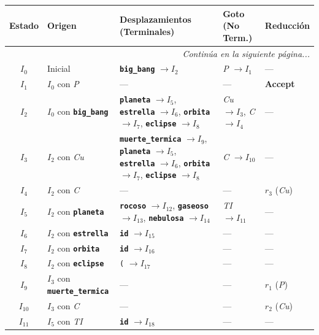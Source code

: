 \documentclass[12pt, letterpaper]{article}
\begin{document}
{\small
\begin{longtable}{c l p{5.0cm} p{2.6cm} p{3.6cm}}
\toprule
\textbf{Estado} & \textbf{Origen} & \textbf{Desplazamientos (Terminales)} & \textbf{Goto (No Term.)} & \textbf{Reducción} \\
\midrule
\endhead
\midrule
\multicolumn{5}{r}{\footnotesize\emph{Continúa en la siguiente página...}} \\
\endfoot
\bottomrule
\endlastfoot

$I_{0}$ & Inicial & \textbf{\texttt{big\_bang}} $\to I_{2}$ & \textit{P} $\to I_{1}$ & --- \\
\addlinespace[2pt]
$I_{1}$ & $I_{0}$ con \textit{P} & --- & --- & \textbf{\color{primary}Accept} \\
\addlinespace[2pt]
$I_{2}$ & $I_{0}$ con \textbf{\texttt{big\_bang}} & \textbf{\texttt{planeta}} $\to I_{5}$, \textbf{\texttt{estrella}} $\to I_{6}$, \textbf{\texttt{orbita}} $\to I_{7}$, \textbf{\texttt{eclipse}} $\to I_{8}$ & \textit{Cu} $\to I_{3}$, \textit{C} $\to I_{4}$ & --- \\
\addlinespace[2pt]
$I_{3}$ & $I_{2}$ con \textit{Cu} & \textbf{\texttt{muerte\_termica}} $\to I_{9}$, \textbf{\texttt{planeta}} $\to I_{5}$, \textbf{\texttt{estrella}} $\to I_{6}$, \textbf{\texttt{orbita}} $\to I_{7}$, \textbf{\texttt{eclipse}} $\to I_{8}$ & \textit{C} $\to I_{10}$ & --- \\
\addlinespace[2pt]
$I_{4}$ & $I_{2}$ con \textit{C} & --- & --- & $r_{3}$ (\textit{Cu}) \\
\addlinespace[2pt]
$I_{5}$ & $I_{2}$ con \textbf{\texttt{planeta}} & \textbf{\texttt{rocoso}} $\to I_{12}$, \textbf{\texttt{gaseoso}} $\to I_{13}$, \textbf{\texttt{nebulosa}} $\to I_{14}$ & \textit{TI} $\to I_{11}$ & --- \\
\addlinespace[2pt]
$I_{6}$ & $I_{2}$ con \textbf{\texttt{estrella}} & \textbf{\texttt{id}} $\to I_{15}$ & --- & --- \\
\addlinespace[2pt]
$I_{7}$ & $I_{2}$ con \textbf{\texttt{orbita}} & \textbf{\texttt{id}} $\to I_{16}$ & --- & --- \\
\addlinespace[2pt]
$I_{8}$ & $I_{2}$ con \textbf{\texttt{eclipse}} & \texttt{(} $\to I_{17}$ & --- & --- \\
\addlinespace[2pt]
$I_{9}$ & $I_{3}$ con \textbf{\texttt{muerte\_termica}} & --- & --- & $r_{1}$ (\textit{P}) \\
\addlinespace[2pt]
$I_{10}$ & $I_{3}$ con \textit{C} & --- & --- & $r_{2}$ (\textit{Cu}) \\
\addlinespace[2pt]
$I_{11}$ & $I_{5}$ con \textit{TI} & \textbf{\texttt{id}} $\to I_{18}$ & --- & --- \\

\end{longtable}}
\end{document}
